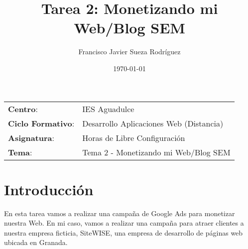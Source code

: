 


\title{
\vspace{10ex}
\normalfont \normalsize
\huge \textbf{Tarea 2: Monetizando mi Web/Blog SEM}
}
\author{Francisco Javier Sueza Rodríguez}
\date{\normalsize\today}



\maketitle

\thispagestyle{empty}

\vspace{65ex}

\begin{center}
    \begin{tabular}{l l}
        \textbf{Centro}: & IES Aguadulce \\
        \textbf{Ciclo Formativo}: & Desarrollo Aplicaciones Web (Distancia)\\
        \textbf{Asignatura}: & Horas de Libre Configuración\\
        \textbf{Tema}: & Tema 2 -  Monetizando mi Web/Blog SEM\\
    \end{tabular}
\end{center}

\newpage

\tableofcontents

\vspace{30ex}

\listoffigures

\newpage

\section{Introducción}
En esta tarea vamos a realizar una campaña de Google Ads para monetizar nuestra Web. En mi caso, vamos a realizar una campaña para atraer clientes a nuestra empresa ficticia, SiteWISE, una empresa de desarrollo de páginas web ubicada en Granada.

